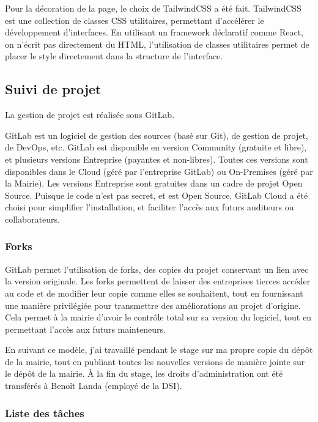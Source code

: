 \documentclass[11pt,french]{memoir}
\begin{document}
	Pour la décoration de la page, le choix de TailwindCSS a été fait.
	TailwindCSS est une collection de classes CSS utilitaires, permettant d’accélérer le développement d’interfaces.
	En utilisant un framework déclaratif comme React, on n’écrit pas directement du HTML, l’utilisation de classes utilitaires permet de placer le style directement dans la structure de l’interface.

	\subsection{Suivi de projet}\label{subsec:suivi-de-projet}

	La gestion de projet est réalisée sous GitLab.

	GitLab est un logiciel de gestion des sources (basé sur Git), de gestion de projet, de DevOps, etc.
	GitLab est disponible en version Community (gratuite et libre), et plusieurs versions Entreprise (payantes et non-libres).
	Toutes ces versions sont disponibles dans le Cloud (géré par l'entreprise GitLab) ou On-Premises (géré par la Mairie).
	Les versions Entreprise sont gratuites dans un cadre de projet Open Source.
	Puisque le code n'est pas secret, et est Open Source, GitLab Cloud a été choisi pour simplifier l'installation, et faciliter l'accès aux futurs auditeurs ou collaborateurs.

	\subsubsection{Forks}

	GitLab permet l'utilisation de forks, des copies du projet conservant un lien avec la version originale.
	Les forks permettent de laisser des entreprises tierces accéder au code et de modifier leur copie comme elles se souhaitent, tout en fournissant une manière privilégiée pour transmettre des améliorations au projet d'origine.
	Cela permet à la mairie d'avoir le contrôle total sur sa version du logiciel, tout en permettant l'accès aux futurs mainteneurs.

	En suivant ce modèle, j'ai travaillé pendant le stage sur ma propre copie du dépôt de la mairie, tout en publiant toutes les nouvelles versions de manière jointe sur le dépôt de la mairie.
	À la fin du stage, les droits d'administration ont été transférés à Benoît Landa (employé de la DSI).

	\subsubsection{Liste des tâches}
\end{document}
